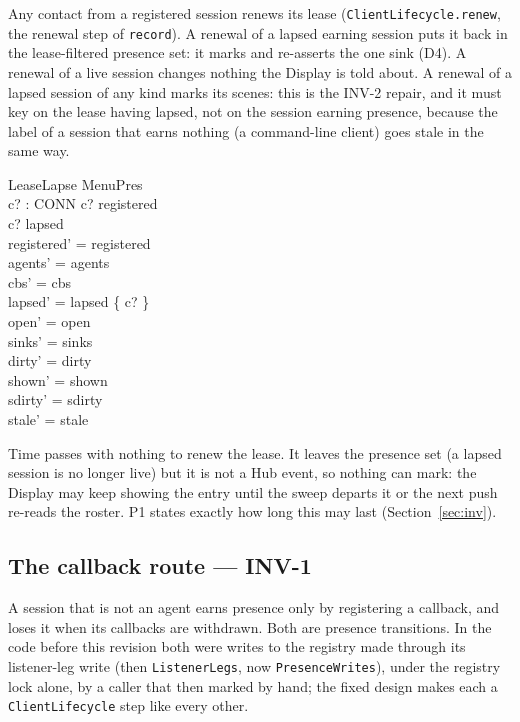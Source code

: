 \documentclass[a4paper,10pt,fleqn]{article}
\begin{document}
Any contact from a registered session renews its lease
(\texttt{ClientLifecycle.renew}, the renewal step of \texttt{record}).
A renewal of a lapsed earning session puts it back in the lease-filtered
presence set: it marks and re-asserts the one sink (D4). A renewal of a live
session changes nothing the Display is told about. A renewal of a lapsed
session of any kind marks its scenes: this is the INV-2 repair, and it must key
on the lease having lapsed, not on the session earning presence, because the
label of a session that earns nothing (a command-line client) goes stale in
the same way.

\begin{schema}{LeaseLapse}
  \Delta MenuPres \\
  c? : CONN
\where
  c? \in registered \\
  c? \notin lapsed \\
  registered' = registered \\
  agents' = agents \\
  cbs' = cbs \\
  lapsed' = lapsed \cup \{ c? \} \\
  open' = open \\
  sinks' = sinks \\
  dirty' = dirty \\
  shown' = shown \\
  sdirty' = sdirty \\
  stale' = stale
\end{schema}

Time passes with nothing to renew the lease. It leaves the presence set
(a lapsed session is no longer live) but it is not a Hub event, so nothing can
mark: the Display may keep showing the entry until the sweep departs it or the
next push re-reads the roster. P1 states exactly how long this may last
(Section~\ref{sec:inv}).

\subsection{The callback route --- INV-1}

A session that is not an agent earns presence only by registering a callback,
and loses it when its callbacks are withdrawn. Both are presence transitions.
In the code before this revision both were writes to the registry made through
its listener-leg write (then \texttt{ListenerLegs}, now \texttt{PresenceWrites}),
under the registry lock alone, by a caller that then marked by hand; the fixed design makes each a \texttt{ClientLifecycle} step like
every other.
\end{document}
